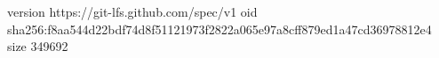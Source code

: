 version https://git-lfs.github.com/spec/v1
oid sha256:f8aa544d22bdf74d8f51121973f2822a065e97a8cff879ed1a47cd36978812e4
size 349692
